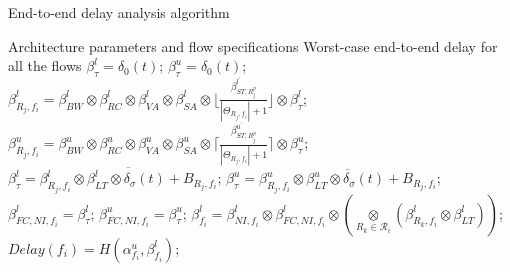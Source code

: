 \documentclass[preprint]{elsarticle}
\begin{document}
\begin{algorithm}
\caption{End-to-end delay analysis algorithm}
\label{alg:equivalentservicecurve}
\begin{algorithmic}[1]
\Require Architecture parameters and flow specifications
\Ensure Worst-case end-to-end delay for all the flows
        \State $\beta_{\tau}^l=\delta_0(t)$; $\beta_{\tau}^u=\delta_0(t)$;
            \State $\beta_{R_j,f_i}^l=\beta_{BW}^l\otimes\beta_{RC}^l\otimes\beta_{VA}^l\otimes\beta_{SA}^l\otimes\lfloor\frac{\beta_{ST,R_j^{p}}^{l^\prime}}{|\Theta_{R_j,f_i}|+1}\rfloor\otimes\beta_{\tau}^l$;
            \State $\beta_{R_j,f_i}^u=\beta_{BW}^u\otimes\beta_{RC}^u\otimes\beta_{VA}^u\otimes\beta_{SA}^u\otimes\lceil\frac{\beta_{ST,R_j^{p}}^{u^\prime}}{|\Theta_{R_j,f_i}|+1}\rceil\otimes\beta_{\tau}^u$;
            \State $\beta_{\tau}^l=\overline{\beta^l_{R_j,f_i}\otimes\beta_{LT}^l\otimes\delta_\sigma(t)+B_{R_j,f_i}}$;
            \State $\beta_{\tau}^u=\overline{\beta^u_{R_j,f_i}\otimes\beta_{LT}^u\otimes\delta_\sigma(t)+B_{R_j,f_i}}$;
        \EndFor
        \State $\beta_{FC,NI,f_i}^l=\beta^l_{\tau}$; $\beta_{FC,NI,f_i}^u=\beta^u_{\tau}$;
        \State $\beta_{f_i}^l=\beta_{NI,f_i}^l\otimes\beta_{FC,NI,f_i}^l\otimes (\underset{R_k\in\mathcal{R}_{i}}{\otimes}(\beta^l_{R_k,f_i}\otimes\beta^l_{LT}))$;
        \State $Delay(f_i)=H(\alpha^u_{f_i},\beta_{f_i}^l)$;
    \EndFor
\end{algorithmic}
\end{algorithm}
\end{document}
